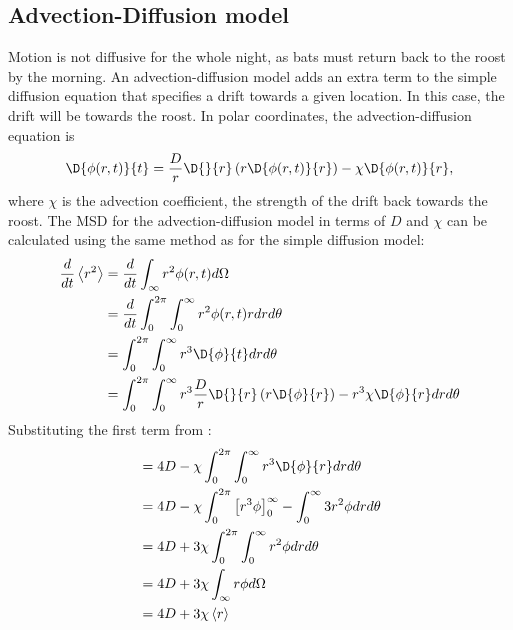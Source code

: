 \subsection{Advection-Diffusion model}
%
Motion is not diffusive for the whole night, as bats must return back to the roost by the morning. An advection-diffusion model adds an extra term to the simple diffusion equation that specifies a drift towards a given location. In this case, the drift will be towards the roost. In polar coordinates, the advection-diffusion equation is
%
\begin{equation}
  \D{\phi(r,t)}{t} = \frac{D}{r} \D{}{r}\left(r \D{\phi(r,t)}{r} \right) - \chi \D{\phi(r,t)}{r},
  \nonumber
\end{equation}
%
where $\chi$ is the advection coefficient, the strength of the drift back towards the roost.
%
The MSD for the advection-diffusion model in terms of $D$ and $\chi$ can be calculated using the same method as for the simple diffusion model:
%
\begin{equation}
\begin{split}
\frac{d}{dt} \left<r^2\right> &= \frac{d}{dt}\int_{\infty}r^2 \phi(r,t) d\Omega \\
                              &= \frac{d}{dt} \int_0^{2\pi}\int_0^{\infty} r^2 \phi(r,t) r dr d\theta \\
                              &= \int_0^{2\pi} \int_0^{\infty} r^3 \D{\phi}{t} dr d\theta \\
                              &= \int_0^{2\pi} \int_0^{\infty} r^3 \frac{D}{r} \D{}{r}\left(r \D{\phi}{r}\right)- r^3\chi\D{\phi}{r} dr d\theta \\
\end{split}
\end{equation}
%
Substituting the first term from :
%
\begin{equation}
\begin{split}
                              &= 4D - \chi \int_0^{2\pi} \int_0^{\infty} r^3 \D{\phi}{r} dr d\theta \\
                              &= 4D - \chi \int_0^{2\pi} \left[ r^3 \phi \right]_0^{\infty} - \int_0^{\infty}  3 r^2 \phi dr d\theta \\
                              &= 4D + 3\chi \int_0^{2\pi} \int_0^{\infty}  r^2 \phi dr d\theta  \\
                              &= 4D + 3\chi \int_{\infty} r \phi d\Omega \\
                              &= 4D + 3\chi \left<r\right>
\nonumber
\end{split}
\end{equation}
